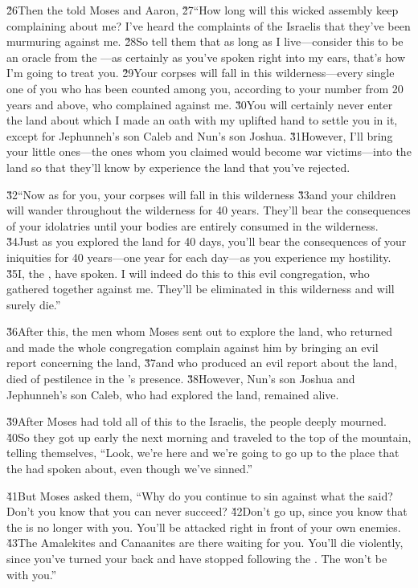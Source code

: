 \v{26}Then the  told Moses and Aaron, \v{27}``How long will this wicked assembly keep complaining about me? I've heard the complaints of the Israelis that they've been murmuring against me. \v{28}So tell them that as long as I live---consider this to be an oracle from the ---as certainly as you've spoken right into my ears, that's how I'm going to treat you. \v{29}Your corpses will fall in this wilderness---every single one of you who has been counted among you, according to your number from 20 years and above, who complained against me. \v{30}You will certainly never enter the land about which I made an oath with my uplifted hand to settle you in it, except for Jephunneh's son Caleb and Nun's son Joshua. \v{31}However, I'll bring your little ones---the ones whom you claimed would become war victims---into the land so that they'll know by experience the land that you've rejected.

\v{32}``Now as for you, your corpses will fall in this wilderness \v{33}and your children will wander throughout the wilderness for 40 years. They'll bear the consequences of your idolatries until your bodies are entirely consumed in the wilderness. \v{34}Just as you explored the land for 40 days, you'll bear the consequences of your iniquities for 40 years---one year for each day---as you experience my hostility. \v{35}I, the , have spoken. I will indeed do this to this evil congregation, who gathered together against me. They'll be eliminated in this wilderness and will surely die.''

\v{36}After this, the men whom Moses sent out to explore the land, who returned and made the whole congregation complain against him by bringing an evil report concerning the land, \v{37}and who produced an evil report about the land, died of pestilence in the 's presence. \v{38}However, Nun's son Joshua and Jephunneh's son Caleb, who had explored the land, remained alive.

\v{39}After Moses had told all of this to the Israelis, the people deeply mourned. \v{40}So they got up early the next morning and traveled to the top of the mountain, telling themselves, ``Look, we're here and we're going to go up to the place that the  had spoken about, even though we've sinned.''

\v{41}But Moses asked them, ``Why do you continue to sin against what the  said? Don't you know that you can never succeed? \v{42}Don't go up, since you know that the  is no longer with you. You'll be attacked right in front of your own enemies. \v{43}The Amalekites and Canaanites are there waiting for you. You'll die violently, since you've turned your back and have stopped following the . The  won't be with you.''

